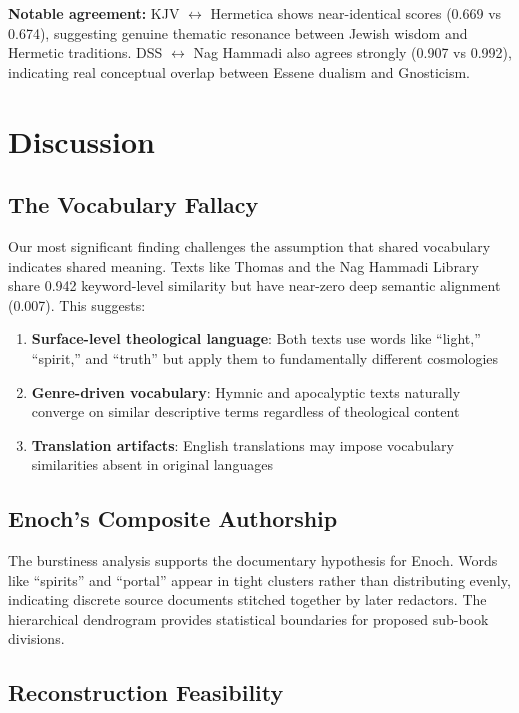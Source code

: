 \documentclass[11pt]{article}
\begin{document}
\textbf{Notable agreement:} KJV $\leftrightarrow$ Hermetica shows near-identical scores (0.669 vs 0.674), suggesting genuine thematic resonance between Jewish wisdom and Hermetic traditions. DSS $\leftrightarrow$ Nag Hammadi also agrees strongly (0.907 vs 0.992), indicating real conceptual overlap between Essene dualism and Gnosticism.

\section{Discussion}

\subsection{The Vocabulary Fallacy}

Our most significant finding challenges the assumption that shared vocabulary indicates shared meaning. Texts like Thomas and the Nag Hammadi Library share 0.942 keyword-level similarity but have near-zero deep semantic alignment (0.007). This suggests:

\begin{enumerate}
    \item \textbf{Surface-level theological language}: Both texts use words like ``light,'' ``spirit,'' and ``truth'' but apply them to fundamentally different cosmologies
    \item \textbf{Genre-driven vocabulary}: Hymnic and apocalyptic texts naturally converge on similar descriptive terms regardless of theological content
    \item \textbf{Translation artifacts}: English translations may impose vocabulary similarities absent in original languages
\end{enumerate}

\subsection{Enoch's Composite Authorship}

The burstiness analysis supports the documentary hypothesis for Enoch. Words like ``spirits'' and ``portal'' appear in tight clusters rather than distributing evenly, indicating discrete source documents stitched together by later redactors. The hierarchical dendrogram provides statistical boundaries for proposed sub-book divisions.

\subsection{Reconstruction Feasibility}
\end{document}
